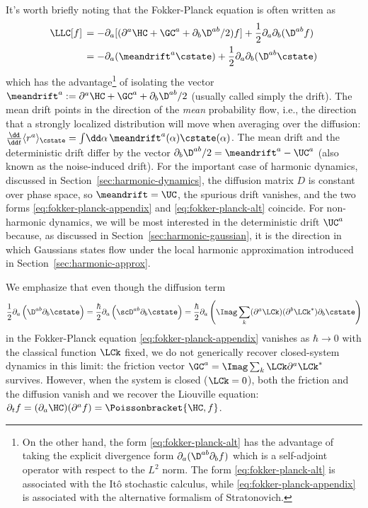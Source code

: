 \documentclass{article}
\numberwithin{equation}{section}
\begin{document}
It's worth briefly noting that the Fokker-Planck equation is often written as
\begin{align}\label{eq:fokker-planck-alt}
    \LLC [f] 
    \, &= -\partial_a [(\partial^a\HC + \GC^a +\partial_b \D^{ab}/2) f]  + \frac{1}{2} \partial_a \partial_b( \D^{ab} f)\\
    \label{eq:def-mean-drift}
    \, &= -\partial_a (\meandrift^a \cstate)  +	\frac{1}{2} \partial_a \partial_b( \D^{ab} \cstate)
\end{align}
which has the advantage\footnote{On the other hand, the form \eqref{eq:fokker-planck-alt} has the advantage of taking the explicit divergence form $\partial_a (\D^{ab} \partial_b f)$ which is a self-adjoint operator with respect to the $L^2$ norm.  The form \eqref{eq:fokker-planck-alt} is associated with the It\^{o} stochastic calculus, while \eqref{eq:fokker-planck-appendix} is associated with the alternative formalism of Stratonovich.} of isolating the  vector
$\meandrift^a := \partial^a \HC +  \GC^a + \partial_b \D^{ab}/2$ (usually called simply the drift).  The mean drift points in the direction of the \emph{mean} probability flow, i.e., the direction that a strongly localized distribution will move when averaging over the diffusion: 
$\frac{\dd}{\dd t} \langle r^a\rangle_\cstate = \int\!\dd \alpha\, \meandrift^a(\alpha) \cstate(\alpha)$. 
The mean drift and the deterministic drift differ by the  vector $\partial_b \D^{ab}/2 = \meandrift^a-\UC^a$ (also known as the noise-induced drift).  For the important case of harmonic dynamics, discussed in Section~\ref{sec:harmonic-dynamics}, the diffusion matrix $D$ is constant over phase space, so $\meandrift = \UC$, the spurious drift vanishes, and the two forms \eqref{eq:fokker-planck-appendix} and \eqref{eq:fokker-planck-alt} coincide.  For non-harmonic dynamics, we will be most interested in the deterministic drift $\UC^a$ because, as discussed in Section~\ref{sec:harmonic-gaussian}, it is the direction in which Gaussians states flow under the local harmonic approximation introduced in Section~\ref{sec:harmonic-approx}.









We emphasize that even though the diffusion term 
\begin{align}
    \frac{1}{2}\partial_a \left( \D^{ab} \partial_b\cstate\right) = \frac{\hbar}{2} \partial_a \left( \scD^{ab} \partial_b\cstate\right) = \frac{\hbar}{2} \partial_a \left(\Imag \sum_k (\partial^a \LCk)(\partial^b \LCk^*) \partial_b\cstate\right)
\end{align} 
in the Fokker-Planck equation \eqref{eq:fokker-planck-appendix} vanishes as $\hbar\to 0$ with the classical function $\LCk$ fixed, we do not generically recover closed-system dynamics in this limit: the friction vector $\GC^a = \Imag \sum_k \LCk \partial^a \LCk^*$ survives.
However, when the system is closed ($\LCk=0$), both the friction and the diffusion vanish and we recover the Liouville equation: $\partial_t f = (\partial_a \HC) (\partial^a f) = \Poissonbracket{\HC,f}$. 
\end{document}
